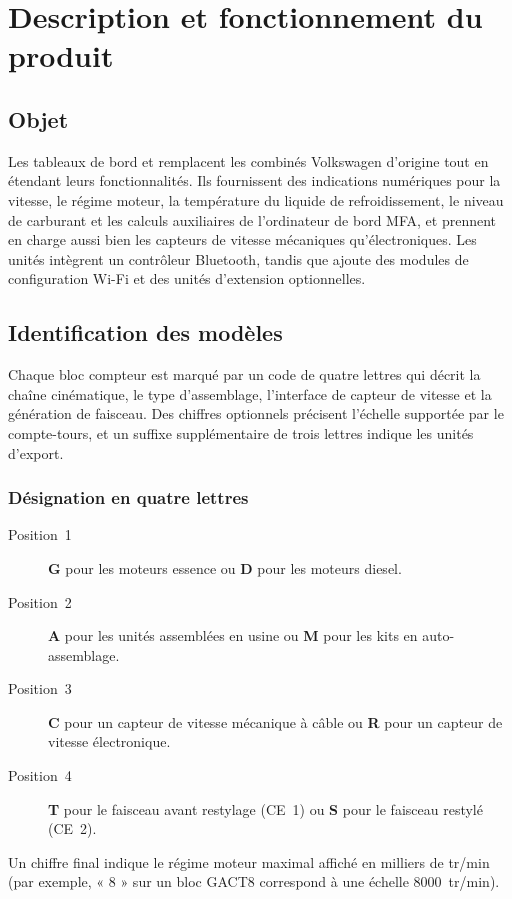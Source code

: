 \chapter{Description et fonctionnement du produit}\label{ch:description}

\section{Objet}
Les tableaux de bord \ReplicaGenOne{} et \ReplicaNextLong{} remplacent les combinés Volkswagen d'origine tout en étendant leurs fonctionnalités.
Ils fournissent des indications numériques pour la vitesse, le régime moteur, la température du liquide de refroidissement, le niveau de carburant et les calculs auxiliaires de l'ordinateur de bord MFA, et prennent en charge aussi bien les capteurs de vitesse mécaniques qu'électroniques.
Les unités \ReplicaGenOneShort{} intègrent un contrôleur Bluetooth, tandis que \ReplicaNextShort{} ajoute des modules de configuration Wi-Fi et des unités d'extension optionnelles.

\section{Identification des modèles}
Chaque bloc compteur est marqué par un code de quatre lettres qui décrit la chaîne cinématique, le type d'assemblage, l'interface de capteur de vitesse et la génération de faisceau.
Des chiffres optionnels précisent l'échelle supportée par le compte-tours, et un suffixe supplémentaire de trois lettres indique les unités d'export.

\subsection{Désignation en quatre lettres}
\begin{description}
    \item[Position~1] \textbf{G} pour les moteurs essence ou \textbf{D} pour les moteurs diesel.
    \item[Position~2] \textbf{A} pour les unités assemblées en usine ou \textbf{M} pour les kits en auto-assemblage.
    \item[Position~3] \textbf{C} pour un capteur de vitesse mécanique à câble ou \textbf{R} pour un capteur de vitesse électronique.
    \item[Position~4] \textbf{T} pour le faisceau avant restylage (CE~1) ou \textbf{S} pour le faisceau restylé (CE~2).
\end{description}
Un chiffre final indique le régime moteur maximal affiché en milliers de tr/min (par exemple, « 8 » sur un bloc GACT8 correspond à une échelle 8000~tr/min).

